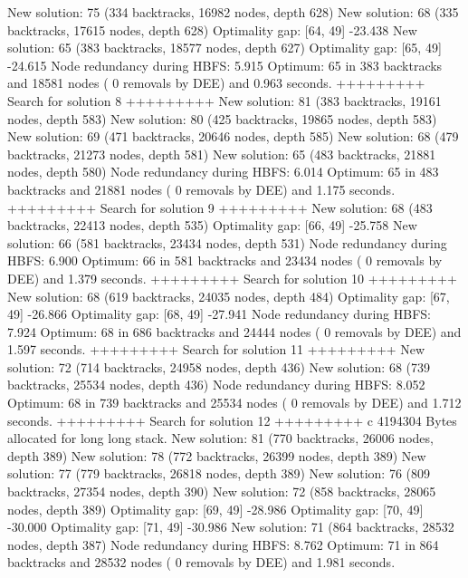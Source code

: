 \begin{enumerate}
{\begin{DoxyCode}
New solution: 75 (334 backtracks, 16982 nodes, depth 628)
New solution: 68 (335 backtracks, 17615 nodes, depth 628)
Optimality gap: [64, 49] -23.438 %
New solution: 65 (383 backtracks, 18577 nodes, depth 627)
Optimality gap: [65, 49] -24.615 %
Node redundancy during HBFS: 5.915 %
Optimum: 65 in 383 backtracks and 18581 nodes ( 0 removals by DEE) and 0.963 seconds.
+++++++++ Search for solution 8 +++++++++
New solution: 81 (383 backtracks, 19161 nodes, depth 583)
New solution: 80 (425 backtracks, 19865 nodes, depth 583)
New solution: 69 (471 backtracks, 20646 nodes, depth 585)
New solution: 68 (479 backtracks, 21273 nodes, depth 581)
New solution: 65 (483 backtracks, 21881 nodes, depth 580)
Node redundancy during HBFS: 6.014 %
Optimum: 65 in 483 backtracks and 21881 nodes ( 0 removals by DEE) and 1.175 seconds.
+++++++++ Search for solution 9 +++++++++
New solution: 68 (483 backtracks, 22413 nodes, depth 535)
Optimality gap: [66, 49] -25.758 %
New solution: 66 (581 backtracks, 23434 nodes, depth 531)
Node redundancy during HBFS: 6.900 %
Optimum: 66 in 581 backtracks and 23434 nodes ( 0 removals by DEE) and 1.379 seconds.
+++++++++ Search for solution 10 +++++++++
New solution: 68 (619 backtracks, 24035 nodes, depth 484)
Optimality gap: [67, 49] -26.866 %
Optimality gap: [68, 49] -27.941 %
Node redundancy during HBFS: 7.924 %
Optimum: 68 in 686 backtracks and 24444 nodes ( 0 removals by DEE) and 1.597 seconds.
+++++++++ Search for solution 11 +++++++++
New solution: 72 (714 backtracks, 24958 nodes, depth 436)
New solution: 68 (739 backtracks, 25534 nodes, depth 436)
Node redundancy during HBFS: 8.052 %
Optimum: 68 in 739 backtracks and 25534 nodes ( 0 removals by DEE) and 1.712 seconds.
+++++++++ Search for solution 12 +++++++++
c 4194304 Bytes allocated for long long stack.
New solution: 81 (770 backtracks, 26006 nodes, depth 389)
New solution: 78 (772 backtracks, 26399 nodes, depth 389)
New solution: 77 (779 backtracks, 26818 nodes, depth 389)
New solution: 76 (809 backtracks, 27354 nodes, depth 390)
New solution: 72 (858 backtracks, 28065 nodes, depth 389)
Optimality gap: [69, 49] -28.986 %
Optimality gap: [70, 49] -30.000 %
Optimality gap: [71, 49] -30.986 %
New solution: 71 (864 backtracks, 28532 nodes, depth 387)
Node redundancy during HBFS: 8.762 %
Optimum: 71 in 864 backtracks and 28532 nodes ( 0 removals by DEE) and 1.981 seconds.

\end{DoxyCode}}
\end{enumerate}
